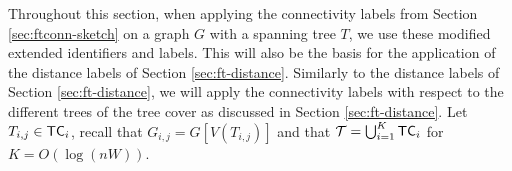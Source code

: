 %
%
%
%
%
Throughout this section, when applying the connectivity labels from Section \ref{sec:ftconn-sketch} on a graph $G$ with a spanning tree $T$, we use these modified extended identifiers and labels. This will also be the basis for the application of the distance labels of Section \ref{sec:ft-distance}. 
Similarly to the distance labels of Section \ref{sec:ft-distance}, we will apply the connectivity labels with respect to the different trees of the tree cover as discussed in Section \ref{sec:ft-distance}. 
Let $T_{i,j} \in \mathsf{TC}_i$, recall that $G_{i,j}=G[V(T_{i,j})]$ and that $\mathcal{T}=\bigcup_{i=1}^K \mathsf{TC}_i$ for $K=O(\log (nW))$. 

